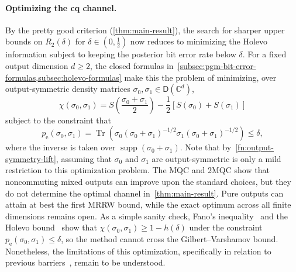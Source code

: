 \documentclass[11pt]{article}
\renewcommand{\leq}{\leqslant}
\renewcommand{\geq}{\geqslant}
\theoremstyle{remark}
\newcommand{\C}{\mathbb{C}}
\newcommand{\Tr}{\operatorname{Tr}}
\newcommand{\supp}{\operatorname{supp}}
\newcommand{\Dens}{\mathsf{D}}
\begin{document}
\paragraph{Optimizing the cq channel.}
\label{open:channel-optimization-open}
By the pretty good criterion (\cref{thm:main-result}), the search for sharper upper bounds on $R_2(\delta)$ for $\delta \in (0,\frac{1}{2})$ now reduces to minimizing the Holevo information subject to keeping the posterior bit error rate below $\delta$. For a fixed output dimension $d \geq 2$, the closed formulas in~\cref{subsec:pgm-bit-error-formulas,subsec:holevo-formulas} make this the problem of minimizing, over output-symmetric density matrices $\sigma_0,\sigma_1 \in \Dens(\C^d)$,
\begin{equation}
\label{eq:objective-function-open}
\chi(\sigma_0,\sigma_1) = S\left(\frac{\sigma_0+\sigma_1}{2}\right) - \frac{1}{2}\left[S(\sigma_0)+S(\sigma_1)\right]
\end{equation}
subject to the constraint that
\begin{equation}
\label{eq:constraint-open}
p_{\mathrm{e}}(\sigma_0,\sigma_1) = \Tr\left(\sigma_0(\sigma_0+\sigma_1)^{-1/2}\sigma_1(\sigma_0+\sigma_1)^{-1/2}\right) \leq \delta,
\end{equation}
where the inverse is taken over $\supp(\sigma_0+\sigma_1)$. Note that by~\cref{fn:output-symmetry-lift}, assuming that $\sigma_0$ and $\sigma_1$ are output-symmetric is only a mild restriction to this optimization problem. The MQC and 2MQC show that noncommuting mixed outputs can improve upon the standard choices, but they do not determine the optimal channel in~\cref{thm:main-result}. Pure outputs can attain at best the first MRRW bound, while the exact optimum across all finite dimensions remains open. As a simple sanity check, Fano's inequality~\cite{Fan61} and the Holevo bound~\cite{Hol73a} show that $\chi(\sigma_0,\sigma_1) \geq 1-h(\delta)$ under the constraint $p_{\mathrm{e}}(\sigma_0,\sigma_1) \leq \delta$, so the method cannot cross the Gilbert--Varshamov bound. Nonetheless, the limitations of this optimization, specifically in relation to previous barriers~\cite{Sam01,NS05,Sam25}, remain to be understood.
\end{document}
